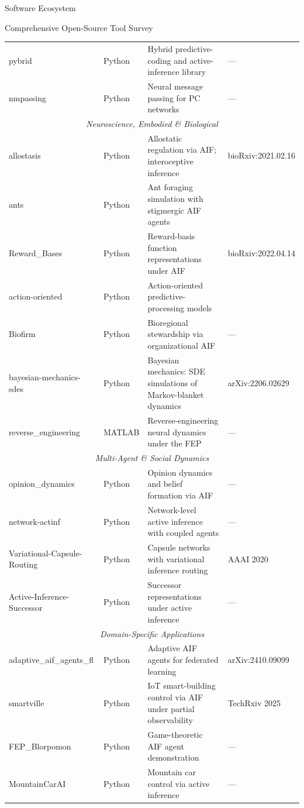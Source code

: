 \documentclass[
  ignorenonframetext,
]{beamer}
\begin{document}
\begin{frame}{Software Ecosystem}
\begin{block}{Comprehensive Open-Source Tool Survey}
\begin{center}
\begin{longtable}{p{3.2cm} p{1.6cm} p{6.4cm} p{2.5cm}}
pybrid & Python & Hybrid predictive-coding and active-inference library & --- \\
nmpassing & Python & Neural message passing for PC networks & --- \\
\midrule
\multicolumn{4}{c}{\textit{Neuroscience, Embodied \& Biological}} \\
\midrule
allostasis & Python & Allostatic regulation via AIF; interoceptive inference & bioRxiv:2021.02.16 \\
ants & Python & Ant foraging simulation with stigmergic AIF agents & \cite{heins2024collective} \\
Reward\_Bases & Python & Reward-basis function representations under AIF & bioRxiv:2022.04.14 \\
action-oriented & Python & Action-oriented predictive-processing models & \cite{tschantz2020action} \\
Biofirm & Python & Bioregional stewardship via organizational AIF & --- \\
bayesian-mechanics-sdes & Python & Bayesian mechanics: SDE simulations of Markov-blanket dynamics & arXiv:2206.02629 \\
reverse\_engineering & MATLAB & Reverse-engineering neural dynamics under the FEP & --- \\
\midrule
\multicolumn{4}{c}{\textit{Multi-Agent \& Social Dynamics}} \\
\midrule
opinion\_dynamics & Python & Opinion dynamics and belief formation via AIF & --- \\
network-actinf & Python & Network-level active inference with coupled agents & --- \\
Variational-Capsule-Routing & Python & Capsule networks with variational inference routing & AAAI 2020 \\
Active-Inference-Successor & Python & Successor representations under active inference & --- \\
\midrule
\multicolumn{4}{c}{\textit{Domain-Specific Applications}} \\
\midrule
adaptive\_aif\_agents\_fl & Python & Adaptive AIF agents for federated learning & arXiv:2410.09099 \\
smartville & Python & IoT smart-building control via AIF under partial observability & TechRxiv 2025 \\
FEP\_Blorpomon & Python & Game-theoretic AIF agent demonstration & --- \\
MountainCarAI & Python & Mountain car control via active inference & --- \\

\end{longtable}
\end{center}
\end{block}
\end{frame}
\end{document}
